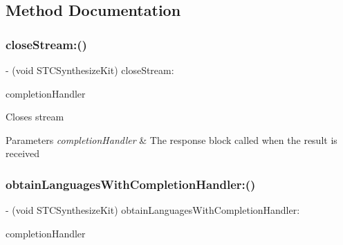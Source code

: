 \subsection{Method Documentation}
\hypertarget{protocol_s_t_c_synthesize_kit_01-p_a19fc7385dd0948bc99b9cbe92470671b}{}\label{protocol_s_t_c_synthesize_kit_01-p_a19fc7385dd0948bc99b9cbe92470671b} 
\subsubsection{\texorpdfstring{close\+Stream\+:()}{closeStream:()}}
{\footnotesize\ttfamily -\/ (void S\+T\+C\+Synthesize\+Kit) close\+Stream\+: \begin{DoxyParamCaption}\item[{(Stream\+Completion\+Handler)}]{completion\+Handler }\end{DoxyParamCaption}}

Closes stream 
\begin{DoxyParams}{Parameters}
{\em completion\+Handler} & The response block called when the result is received \\
\hline
\end{DoxyParams}
\hypertarget{protocol_s_t_c_synthesize_kit_01-p_a1679a8853f228bf9799eaa8ed1a49c09}{}\label{protocol_s_t_c_synthesize_kit_01-p_a1679a8853f228bf9799eaa8ed1a49c09} 
\subsubsection{\texorpdfstring{obtain\+Languages\+With\+Completion\+Handler\+:()}{obtainLanguagesWithCompletionHandler:()}}
{\footnotesize\ttfamily -\/ (void S\+T\+C\+Synthesize\+Kit) obtain\+Languages\+With\+Completion\+Handler\+: \begin{DoxyParamCaption}\item[{(Language\+Completion\+Handler)}]{completion\+Handler }\end{DoxyParamCaption}}

